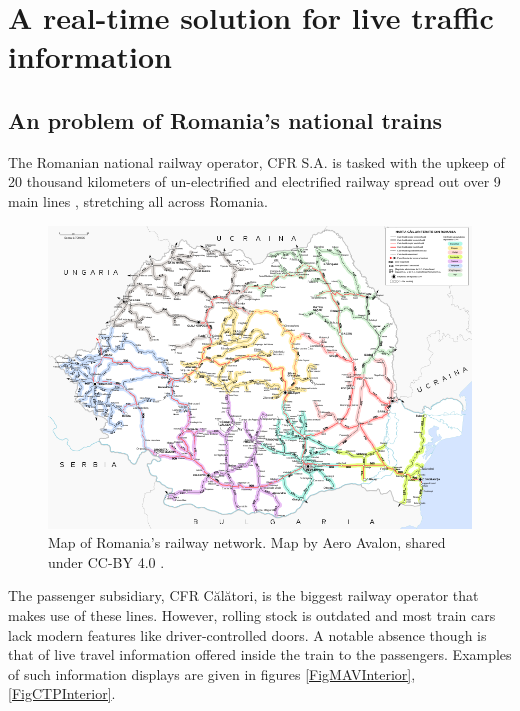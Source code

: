 \chapter{A real-time solution for live traffic information}

\section{An problem of Romania's national trains}
The Romanian national railway operator, CFR S.A. is tasked with the upkeep of 20 thousand kilometers of un-electrified and electrified railway spread out over 9 main lines \cite{CFROrdinMagistrale} \cite{WallstreetRoReorganizareSNCFR}, stretching all across Romania.

\begin{figure}[htbp]
    \centering
    \includegraphics[width=\textwidth]{./figures/ch3_romania-feroviara.png}
    \caption{Map of Romania's railway network. Map by Aero Avalon, shared under CC-BY 4.0 \cite{WikipediaRomaniaFeroviara}.}
    \label{FigRomaniaFeroviara}
\end{figure}

The passenger subsidiary, CFR Călători, is the biggest railway operator that makes use of these lines. However, rolling stock is outdated and most train cars lack modern features like driver-controlled doors. A notable absence though is that of live travel information offered inside the train to the passengers. Examples of such information displays are given in figures \ref{FigMAVInterior}, \ref{FigCTPInterior}.

